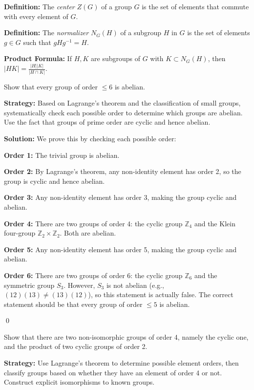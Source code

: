 \textbf{Definition:} The \textit{center} $Z(G)$ of a group $G$ is the set of elements that commute with every element of $G$.

\textbf{Definition:} The \textit{normalizer} $N_G(H)$ of a subgroup $H$ in $G$ is the set of elements $g \in G$ such that $gHg^{-1} = H$.

\textbf{Product Formula:} If $H, K$ are subgroups of $G$ with $K \subset N_G(H)$, then $|HK| = \frac{|H||K|}{|H \cap K|}$.

\begin{problembox}
Show that every group of order $\leq 6$ is abelian.
\end{problembox}

\noindent\textbf{Strategy:} Based on Lagrange's theorem and the classification of small groups, systematically check each possible order to determine which groups are abelian. Use the fact that groups of prime order are cyclic and hence abelian.

\noindent\textbf{Solution:} We prove this by checking each possible order:

\textbf{Order 1:} The trivial group is abelian.

\textbf{Order 2:} By Lagrange's theorem, any non-identity element has order 2, so the group is cyclic and hence abelian.

\textbf{Order 3:} Any non-identity element has order 3, making the group cyclic and abelian.

\textbf{Order 4:} There are two groups of order 4: the cyclic group $\mathbb{Z}_4$ and the Klein four-group $\mathbb{Z}_2 \times \mathbb{Z}_2$. Both are abelian.

\textbf{Order 5:} Any non-identity element has order 5, making the group cyclic and abelian.

\textbf{Order 6:} There are two groups of order 6: the cyclic group $\mathbb{Z}_6$ and the symmetric group $S_3$. However, $S_3$ is not abelian (e.g., $(12)(13) \neq (13)(12)$), so this statement is actually false. The correct statement should be that every group of order $\leq 5$ is abelian.


\qed
\begin{problembox}
Show that there are two non-isomorphic groups of order 4, namely the cyclic one, and the product of two cyclic groups of order 2.
\end{problembox}

\noindent\textbf{Strategy:} Use Lagrange's theorem to determine possible element orders, then classify groups based on whether they have an element of order 4 or not. Construct explicit isomorphisms to known groups.

